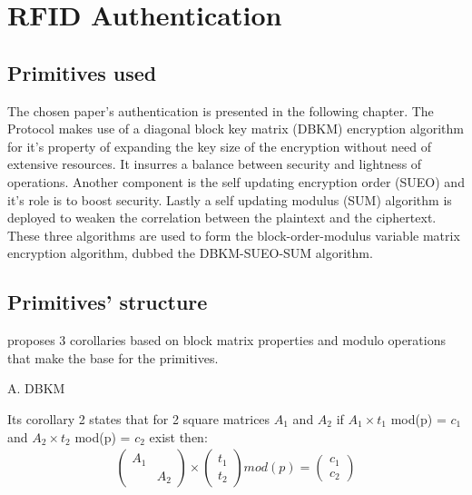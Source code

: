 \chapter{RFID Authentication}

\section{Primitives used}
\hspace*{1cm} 
    The chosen paper\cite{BOM}'s authentication is presented in the following chapter. The Protocol makes use of a diagonal block key matrix (DBKM) encryption algorithm for it's property of 
    expanding the key size of the encryption without need of extensive resources. It insurres a balance between security and lightness of operations. Another component is the self updating encryption 
    order (SUEO) and it's role is to boost security. Lastly a self updating modulus (SUM) algorithm is deployed to weaken the correlation between the plaintext and the ciphertext. \\
\hspace*{1cm}
    These three algorithms are used to form the block-order-modulus variable matrix encryption algorithm, dubbed the DBKM-SUEO-SUM algorithm.

\section{Primitives' structure}
\hspace*{1cm}

    \cite{BOM} proposes 3 corollaries based on block matrix properties and modulo operations that make the base for the primitives.

\vspace{0.5cm}
\hspace{1cm}
    A. DBKM

    Its corollary 2 states that for 2 square matrices $A_1$ and $A_2$ if $A_1 \times t_1$ mod(p) = $c_1$ and $A_2 \times t_2$ mod(p) = $c_2$ exist then:
    \begin{gather}
        \begin{pmatrix}
        A_1 &  \\
            & A_2
        \end{pmatrix}
        \times
        \begin{pmatrix}
            t_1  \\
            t_2
        \end{pmatrix}
        mod(p)
        =
        \begin{pmatrix}
            c_1  \\
            c_2
        \end{pmatrix}
    \end{gather}

